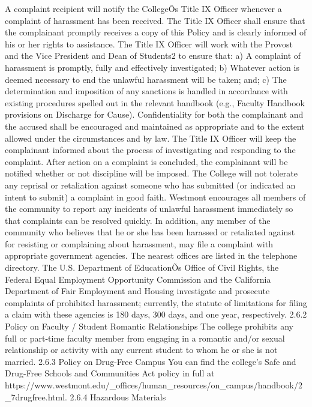 \documentclass[letterpaper, 11pt]{article}
\begin{document}
   A complaint recipient will notify the CollegeÕs Title IX Officer whenever a complaint of harassment has been received.  The Title IX Officer shall ensure that the complainant promptly receives a copy of this Policy and is clearly informed of his or her rights to assistance.
   The Title IX Officer will work with the Provost and the Vice President and Dean of Students2 to ensure that:
a) A complaint of harassment is promptly, fully and effectively investigated;
b) Whatever action is deemed necessary to end the unlawful harassment will be taken; and;
c) The determination and imposition of any sanctions is handled in accordance with existing procedures spelled out in the relevant handbook (e.g., Faculty Handbook provisions on Discharge for Cause).
   Confidentiality for both the complainant and the accused shall be encouraged and maintained as appropriate and to the extent allowed under the circumstances and by law.
   The Title IX Officer will keep the complainant informed about the process of investigating and responding to the complaint.  After action on a complaint is concluded, the complainant will be notified whether or not discipline will be imposed.  The College will not tolerate any reprisal or retaliation against someone who has submitted (or indicated an intent to submit) a complaint in good faith.
   Westmont encourages all members of the community to report any incidents of unlawful harassment immediately so that complaints can be resolved quickly.  In addition, any member of the community who believes that he or she has been harassed or retaliated against for resisting or complaining about harassment, may file a complaint with appropriate government agencies.  The nearest offices are listed in the telephone directory. The U.S. Department of EducationÕs Office of Civil Rights, the Federal Equal Employment Opportunity Commission and the California Department of Fair Employment and Housing investigate and prosecute complaints of prohibited harassment; currently, the statute of limitations for filing a claim with these agencies is 180 days, 300 days, and one year, respectively.
2.6.2 Policy on Faculty / Student Romantic Relationships
The college prohibits any full or part-time faculty member from engaging in a romantic and/or sexual relationship or activity with any current student to whom he or she is not married.
2.6.3 Policy on Drug-Free Campus
   You can find the college's Safe and Drug-Free Schools and Communities Act policy in full at https://www.westmont.edu/_offices/human_resources/on_campus/handbook/2_7drugfree.html.
2.6.4 Hazardous Materials
\end{document}
